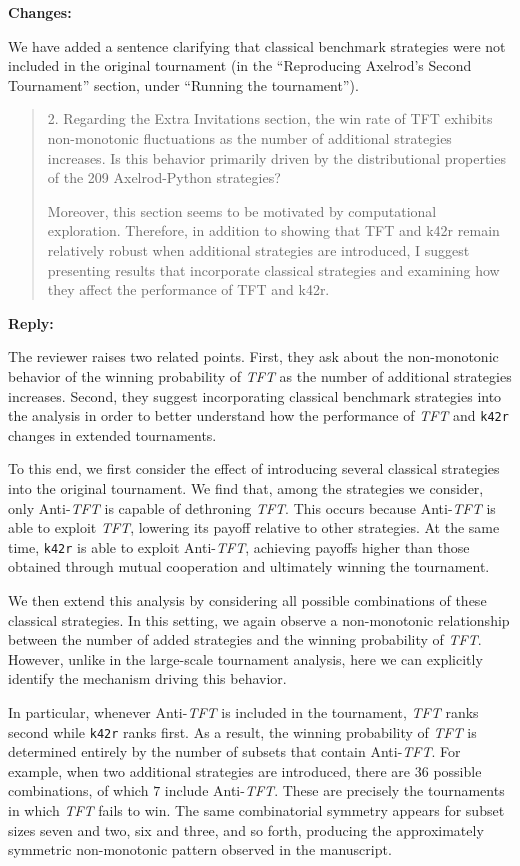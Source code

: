 \documentclass[11pt]{article}
\newcommand{\reply}{
\vspace{0.25em}
{\color{ForestGreen}\textbf{Reply:}}
}
\newcommand{\changes}{
\vspace{0.25em}
{\color{BrickRed}\textbf{Changes:}}
}
\newenvironment{reviewercomment}
{
\vspace{0.5em}
\begin{quote}
\color{NavyBlue}
}
{
\end{quote}
}
\newcommand{\TFT}{\emph{TFT}}
\begin{document}
\changes

We have added a sentence clarifying that classical benchmark strategies were not
included in the original tournament (in the ``Reproducing Axelrod's Second
Tournament'' section, under ``Running the tournament'').

\begin{reviewercomment}
2. Regarding the Extra Invitations section, the win rate of TFT exhibits
non-monotonic fluctuations as the number of additional strategies increases. Is
this behavior primarily driven by the distributional properties of the 209
Axelrod-Python strategies? 

Moreover, this section seems to be motivated by
computational exploration. Therefore, in addition to showing that TFT and k42r
remain relatively robust when additional strategies are introduced, I suggest
presenting results that incorporate classical strategies and examining how they
affect the performance of TFT and k42r.
\end{reviewercomment}

\reply

The reviewer raises two related points. First, they ask about the
non-monotonic behavior of the winning probability of \TFT{} as the number of
additional strategies increases. Second, they suggest incorporating classical
benchmark strategies into the analysis in order to better understand how the
performance of \TFT{} and \texttt{k42r} changes in extended tournaments.

To this end, we first consider the effect of introducing several classical
strategies into the original tournament. We find that, among the strategies we
consider, only Anti-\TFT{} is capable of dethroning \TFT{}. This occurs because
Anti-\TFT{} is able to exploit \TFT{}, lowering its payoff relative to other
strategies. At the same time, \texttt{k42r} is able to exploit Anti-\TFT{},
achieving payoffs higher than those obtained through mutual cooperation and
ultimately winning the tournament.

We then extend this analysis by considering all possible combinations of these
classical strategies. In this setting, we again observe a non-monotonic
relationship between the number of added strategies and the winning probability
of \TFT{}. However, unlike in the large-scale tournament analysis, here we can
explicitly identify the mechanism driving this behavior.

In particular, whenever Anti-\TFT{} is included in the tournament, \TFT{}
ranks second while \texttt{k42r} ranks first. As a result, the winning
probability of \TFT{} is determined entirely by the number of subsets that
contain Anti-\TFT{}. For example, when two additional strategies are
introduced, there are \(36\) possible combinations, of which \(7\) include
Anti-\TFT{}. These are precisely the tournaments in which \TFT{} fails to win.
The same combinatorial symmetry appears for subset sizes seven and two, six and
three, and so forth, producing the approximately symmetric non-monotonic
pattern observed in the manuscript.
\end{document}
